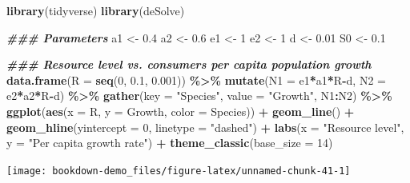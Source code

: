 \documentclass[
]{book}
\newenvironment{Shaded}{\begin{snugshade}}{\end{snugshade}}
\newcommand{\AttributeTok}[1]{\textcolor[rgb]{0.13,0.29,0.53}{#1}}
\newcommand{\DecValTok}[1]{\textcolor[rgb]{0.00,0.00,0.81}{#1}}
\newcommand{\DocumentationTok}[1]{\textcolor[rgb]{0.56,0.35,0.01}{\textbf{\textit{#1}}}}
\newcommand{\FloatTok}[1]{\textcolor[rgb]{0.00,0.00,0.81}{#1}}
\newcommand{\FunctionTok}[1]{\textcolor[rgb]{0.13,0.29,0.53}{\textbf{#1}}}
\newcommand{\NormalTok}[1]{#1}
\newcommand{\OtherTok}[1]{\textcolor[rgb]{0.56,0.35,0.01}{#1}}
\newcommand{\SpecialCharTok}[1]{\textcolor[rgb]{0.81,0.36,0.00}{\textbf{#1}}}
\newcommand{\StringTok}[1]{\textcolor[rgb]{0.31,0.60,0.02}{#1}}
\begin{document}
\begin{Shaded}
\begin{Highlighting}[]
\FunctionTok{library}\NormalTok{(tidyverse)}
\FunctionTok{library}\NormalTok{(deSolve)}

\DocumentationTok{\#\#\# Parameters}
\NormalTok{a1 }\OtherTok{\textless{}{-}} \FloatTok{0.4} 
\NormalTok{a2 }\OtherTok{\textless{}{-}} \FloatTok{0.6}
\NormalTok{e1 }\OtherTok{\textless{}{-}} \DecValTok{1}
\NormalTok{e2 }\OtherTok{\textless{}{-}} \DecValTok{1}
\NormalTok{d }\OtherTok{\textless{}{-}} \FloatTok{0.01} 
\NormalTok{S0 }\OtherTok{\textless{}{-}} \FloatTok{0.1}

\DocumentationTok{\#\#\# Resource level vs. consumers\textquotesingle{} per capita population growth}
\FunctionTok{data.frame}\NormalTok{(}\AttributeTok{R =} \FunctionTok{seq}\NormalTok{(}\DecValTok{0}\NormalTok{, }\FloatTok{0.1}\NormalTok{, }\FloatTok{0.001}\NormalTok{)) }\SpecialCharTok{\%\textgreater{}\%}
  \FunctionTok{mutate}\NormalTok{(}\AttributeTok{N1 =}\NormalTok{ e1}\SpecialCharTok{*}\NormalTok{a1}\SpecialCharTok{*}\NormalTok{R}\SpecialCharTok{{-}}\NormalTok{d,}
         \AttributeTok{N2 =}\NormalTok{ e2}\SpecialCharTok{*}\NormalTok{a2}\SpecialCharTok{*}\NormalTok{R}\SpecialCharTok{{-}}\NormalTok{d) }\SpecialCharTok{\%\textgreater{}\%}
  \FunctionTok{gather}\NormalTok{(}\AttributeTok{key =} \StringTok{"Species"}\NormalTok{, }\AttributeTok{value =} \StringTok{"Growth"}\NormalTok{, N1}\SpecialCharTok{:}\NormalTok{N2) }\SpecialCharTok{\%\textgreater{}\%}
  \FunctionTok{ggplot}\NormalTok{(}\FunctionTok{aes}\NormalTok{(}\AttributeTok{x =}\NormalTok{ R, }\AttributeTok{y =}\NormalTok{ Growth, }\AttributeTok{color =}\NormalTok{ Species)) }\SpecialCharTok{+}
  \FunctionTok{geom\_line}\NormalTok{() }\SpecialCharTok{+} 
  \FunctionTok{geom\_hline}\NormalTok{(}\AttributeTok{yintercept =} \DecValTok{0}\NormalTok{, }\AttributeTok{linetype =} \StringTok{"dashed"}\NormalTok{) }\SpecialCharTok{+} 
  \FunctionTok{labs}\NormalTok{(}\AttributeTok{x =} \StringTok{"Resource level"}\NormalTok{, }\AttributeTok{y =} \StringTok{"Per capita growth rate"}\NormalTok{) }\SpecialCharTok{+}
  \FunctionTok{theme\_classic}\NormalTok{(}\AttributeTok{base\_size =} \DecValTok{14}\NormalTok{)}
\end{Highlighting}
\end{Shaded}

\begin{center}\texttt{[image: bookdown-demo\_files/figure-latex/unnamed-chunk-41-1]} \end{center}
\end{document}
